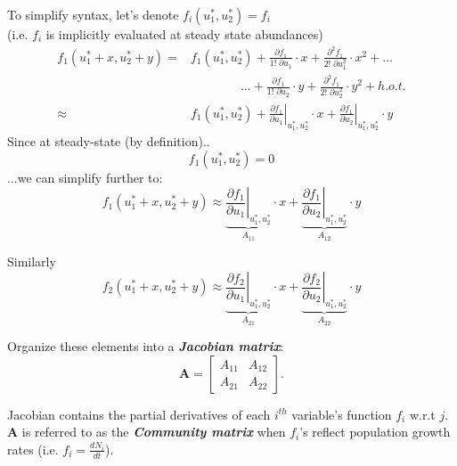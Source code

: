 \documentclass{article}
\newcommand{\ind}{\-\hspace{1cm}}
\begin{document}
To simplify syntax, let's denote $f_i(u_1^*,u_2^*) = f_i$\\
\ind (i.e. $f_i$ is implicitly evaluated at steady state abundances)
\begin{align*}
	f_1(u_1^* + x, u_2^* + y) = & f_1(u_1^*,u_2^*) + \frac{\partial f_1}{1! \phantom{.}\partial u_1} \cdot x + \frac{\partial^2 f_1}{2! \phantom{.} \partial u_1^2} \cdot x^2 + ...\\
	&\quad \quad \quad \quad ...  + \frac{\partial f_1}{1!\phantom{.} \partial u_2} \cdot y + \frac{\partial^2 f_1}{2!\phantom{.} \partial u_2^2} \cdot y^2 + h.o.t.\\
	 \approx & f_1(u_1^*, u_2^*) + \left. \frac{\partial f_1}{\partial u_1}\right|_{u_1^*, u_2^*} \cdot x + \left. \frac{\partial f_1}{\partial u_2}\right|_{u_1^*, u_2^*} \cdot y
\end{align*}
Since at steady-state (by definition)..
\begin{equation*}
	f_1(u_1^*,u_2^*)=0
\end{equation*}
...we can simplify further to:
\begin{equation*}
	f_1(u_1^* + x, u_2^* + y)\approx \underbrace{\left. \frac{\partial f_1}{\partial u_1}\right|_{u_1^*, u_2^*}}_{A_{11}} \cdot x + \underbrace{\left. \frac{\partial f_1}{\partial u_2}\right|_{u_1^*, u_2^*}}_{A_{12}} \cdot y
\end{equation*}

Similarly
\begin{equation*}
	f_2(u_1^* + x, u_2^* + y)\approx \underbrace{\left. \frac{\partial f_2}{\partial u_1}\right|_{u_1^*, u_2^*}}_{A_{21}} \cdot x + \underbrace{\left. \frac{\partial f_2}{\partial u_2}\right|_{u_1^*, u_2^*}}_{A_{22}} \cdot y
\end{equation*}

Organize these elements into a \emph{\textbf{Jacobian matrix}}:
\begin{equation*}
\mathbf{A}=
	\begin{bmatrix}
	A_{11} & A_{12}\\
	A_{21} & A_{22}
	\end{bmatrix}.
\end{equation*}

Jacobian contains the partial derivatives of each $i^{th}$ variable's function $f_i$ w.r.t $j$.\\

\textbf{A} is referred to as the \emph{\textbf{Community matrix}} when $f_i$'s reflect population growth rates (i.e. $f_i=\tfrac{dN_i}{dt}$).\\
\end{document}

